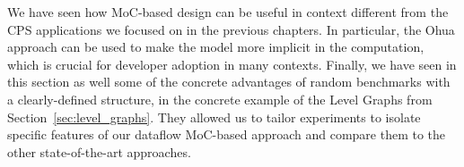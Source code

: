 We have seen how \ac{MoC}-based design can be useful in context different from the \ac{CPS} applications we focused on in the previous chapters.
In particular, the Ohua approach can be used to make the model more implicit in the computation, which is crucial for developer adoption in many contexts.
Finally, we have seen in this section as well some of the concrete advantages of random benchmarks with a clearly-defined structure, in the concrete example of the Level Graphs from Section~\ref{sec:level_graphs}.
They allowed us to tailor experiments to isolate specific features of our dataflow \ac{MoC}-based approach and compare them to the other state-of-the-art approaches.